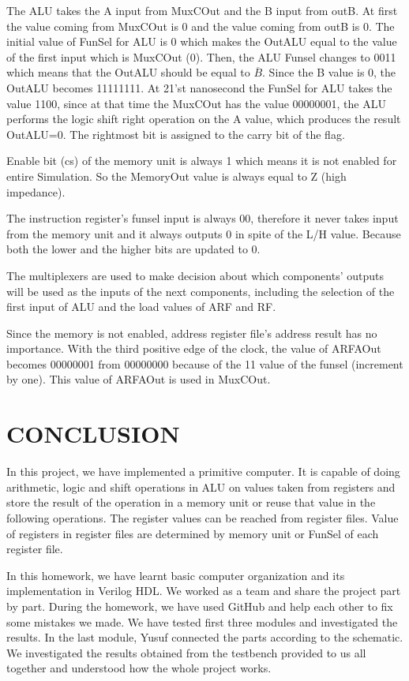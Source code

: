 \documentclass[pdftex,12pt,a4paper]{article}
\begin{document}
The ALU takes the A input from MuxCOut and the B input from outB. At first the value coming from MuxCOut is 0 and the value coming
from outB is 0. The initial value of FunSel for ALU is 0 which makes the OutALU equal to the value of the first input which is 
MuxCOut (0). Then, the ALU Funsel changes to 0011 which means that the OutALU should be equal to $\overline{B}$. Since the B value
is 0, the OutALU becomes 11111111. At 21'st nanosecond the FunSel for ALU takes the value 1100, since at that time the MuxCOut has
the value 00000001, the ALU performs the logic shift right operation on the A value, which produces the result OutALU=0. The rightmost
bit is assigned to the carry bit of the flag.

Enable bit (cs) of the memory unit is always 1 which means it is not enabled for entire Simulation. So the MemoryOut value is always
equal to Z (high impedance). 

The instruction register's funsel input is always 00, therefore it never takes input from the memory unit and it always outputs 0 
in spite of the L/H value. Because both the lower and the higher bits are updated to 0.

The multiplexers are used to make decision about which components' outputs will be used as the inputs of the next components, including
the selection of the first input of ALU and the load values of ARF and RF.

Since the memory is not enabled, address register file's address result has no importance. With the third positive edge of the clock, 
the value of ARFAOut becomes 00000001 from 00000000 because of the 11 value of the funsel (increment by one). This value of ARFAOut
is used in MuxCOut.

\section{CONCLUSION}
In this project, we have implemented a primitive computer. It is capable of doing arithmetic, logic and shift operations in ALU on values taken from
registers and store the result of the operation in a memory unit or reuse that value in the following operations. The register values can be 
reached from register files. Value of registers in register files are determined by memory unit or FunSel of each register file.

In this homework, we have learnt basic computer organization and its implementation in Verilog HDL. We worked as a team and share the project part by part.
During the homework, we have used GitHub and help each other to fix some mistakes we made. We have tested first three modules and investigated the results.
In the last module, Yusuf connected the parts according to the schematic. We investigated the results obtained from the testbench provided to us all together
and understood how the whole project works.
\end{document}
